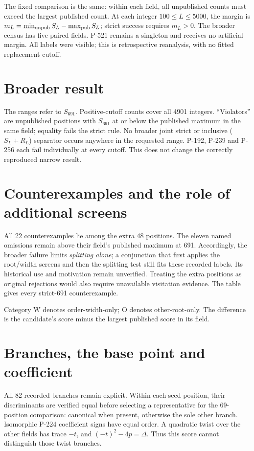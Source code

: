 \documentclass[10pt]{article}
\begin{document}
The fixed comparison is the same: within each field, all unpublished counts
must exceed the largest published count. At each integer $100\le L\le5000$,
the margin is $m_L=\min_{\rm unpub}S_L-\max_{\rm pub}S_L$; strict success
requires $m_L>0$. The broader census has five paired fields. P-521 remains
a singleton and receives no artificial margin. All labels were visible;
this is retrospective reanalysis, with no fitted replacement cutoff.

\section{Broader result}
\begin{center}\small\end{center}
The ranges refer to $S_{691}$. Positive-cutoff counts cover all 4901 integers.
``Violators'' are unpublished positions with $S_{691}$ at or below the
published maximum in the same field; equality fails the strict rule.
No broader joint strict or inclusive ($S_L+R_L$) separator occurs anywhere
in the requested range. P-192, P-239 and P-256 each fail individually at
every cutoff. This does not change the correctly reproduced narrow result.
\clearpage

\section{Counterexamples and the role of additional screens}
\begin{center}\small\end{center}
All 22 counterexamples lie among the extra 48 positions. The eleven named
omissions remain above their field's published maximum at 691. Accordingly,
the broader failure limits \emph{splitting alone}; a conjunction that first
applies the root/width screens and then the splitting test still fits these
recorded labels. Its historical use and motivation remain unverified. Treating
the extra positions as original rejections would also require unavailable
visitation evidence. The table gives every strict-691 counterexample.

\begin{center}\small\end{center}
Category W denotes order-width-only; O denotes other-root-only. The difference
is the candidate's score minus the largest published score in its field.

\section{Branches, the base point and coefficient}
All 82 recorded branches remain explicit. Within each seed position, their
discriminants are verified equal before selecting a representative for the
69-position comparison: canonical when present, otherwise the sole other
branch. Isomorphic P-224 coefficient signs have equal order. A quadratic
twist over the other fields has trace $-t$, and $(-t)^2-4p=\Delta$.
Thus this score cannot distinguish those twist branches.
\end{document}
